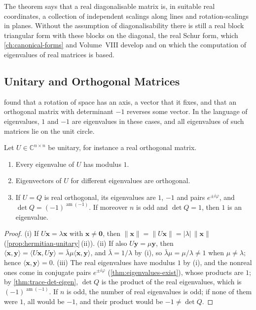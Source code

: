 The theorem says that a real diagonalisable matrix is, in suitable real coordinates, a collection of independent scalings along lines and rotation-scalings in planes. Without the assumption of diagonalisability there is still a real block triangular form with these blocks on the diagonal, the real Schur form, which \cref{ch:canonical-forms} and Volume~VIII develop and on which the computation of eigenvalues of real matrices is based.

\subsection{Unitary and Orthogonal Matrices}

 found that a rotation of space has an axis, a vector that it fixes, and that an orthogonal matrix with determinant $-1$ reverses some vector. In the language of eigenvalues, $1$ and $-1$ are eigenvalues in these cases, and all eigenvalues of such matrices lie on the unit circle.

\begin{proposition}
\label{prop:unitary-eigen}
Let $U\in\mathbb C^{n\times n}$ be unitary, for instance a real orthogonal matrix.
\begin{enumerate}
\item Every eigenvalue of $U$ has modulus $1$.
\item Eigenvectors of $U$ for different eigenvalues are orthogonal.
\item If $U=Q$ is real orthogonal, its eigenvalues are $1$, $-1$ and pairs $e^{\pm i\varphi}$, and $\det Q=(-1)^{\operatorname{am}(-1)}$. If moreover $n$ is odd and $\det Q=1$, then $1$ is an eigenvalue.
\end{enumerate}
\end{proposition}

\begin{proof}
(i) If $U\mathbf x=\lambda\mathbf x$ with $\mathbf x\ne\mathbf 0$, then $\|\mathbf x\|=\|U\mathbf x\|=|\lambda|\,\|\mathbf x\|$ (\cref{prop:hermitian-unitary}\,(ii)). (ii) If also $U\mathbf y=\mu\mathbf y$, then $\langle\mathbf x,\mathbf y\rangle=\langle U\mathbf x,U\mathbf y\rangle=\bar\lambda\mu\langle\mathbf x,\mathbf y\rangle$, and $\bar\lambda=1/\lambda$ by (i), so $\bar\lambda\mu=\mu/\lambda\ne1$ when $\mu\ne\lambda$; hence $\langle\mathbf x,\mathbf y\rangle=0$. (iii) The real eigenvalues have modulus $1$ by (i), and the nonreal ones come in conjugate pairs $e^{\pm i\varphi}$ (\cref{thm:eigenvalues-exist}), whose products are $1$; by \cref{thm:trace-det-eigen}, $\det Q$ is the product of the real eigenvalues, which is $(-1)^{\operatorname{am}(-1)}$. If $n$ is odd, the number of real eigenvalues is odd; if none of them were $1$, all would be $-1$, and their product would be $-1\ne\det Q$.
\end{proof}

